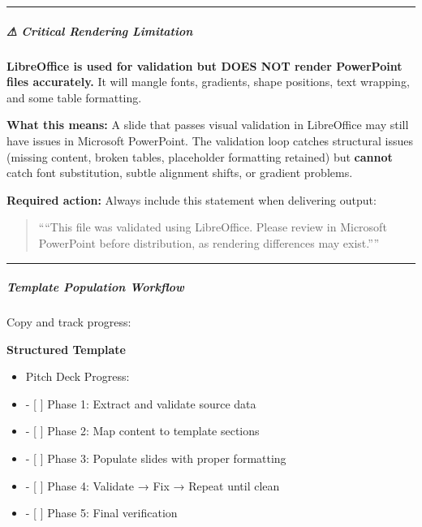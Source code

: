 \documentclass[11pt]{article}
\begin{document}
\vspace{0.5em}\hrule\vspace{0.5em}

\subparagraph{⚠ Critical Rendering Limitation}\mbox{}\par

\textbf{LibreOffice is used for validation but DOES NOT render PowerPoint files accurately.} It will mangle fonts, gradients, shape positions, text wrapping, and some table formatting.


\textbf{What this means:} A slide that passes visual validation in LibreOffice may still have issues in Microsoft PowerPoint. The validation loop catches structural issues (missing content, broken tables, placeholder formatting retained) but \textbf{cannot} catch font substitution, subtle alignment shifts, or gradient problems.


\textbf{Required action:} Always include this statement when delivering output:

\begin{quote}
````This file was validated using LibreOffice. Please review in Microsoft PowerPoint before distribution, as rendering differences may exist.''''
\end{quote}

\vspace{0.5em}\hrule\vspace{0.5em}

\subparagraph{Template Population Workflow}\mbox{}\par

Copy and track progress:


\textbf{Structured Template}
\begin{itemize}[leftmargin=*,itemsep=2pt,topsep=2pt]
\item {} Pitch Deck Progress:
\item {} - [ ] Phase 1: Extract and validate source data
\item {} - [ ] Phase 2: Map content to template sections
\item {} - [ ] Phase 3: Populate slides with proper formatting
\item {} - [ ] Phase 4: Validate → Fix → Repeat until clean
\item {} - [ ] Phase 5: Final verification
\end{itemize}
\end{document}

